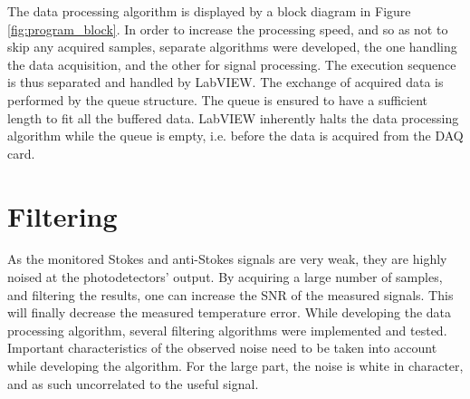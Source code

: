 \documentclass{standalone}
\begin{document}
The data processing algorithm is displayed by a block diagram in Figure \ref{fig:program_block}.
In order to increase the processing speed, and so as not to skip any acquired samples, separate algorithms were developed, the one handling the data acquisition, and the other for signal processing. The execution sequence is thus separated and handled by LabVIEW. The exchange of acquired data is performed by the queue structure. The queue is ensured to have a sufficient length to fit all the buffered data. LabVIEW inherently halts the data processing algorithm while the queue is empty, i.e. before the data is acquired from the DAQ card.

\section{Filtering}

As the monitored Stokes and anti-Stokes signals are very weak, they are highly noised at the photodetectors' output. By acquiring a large number of samples, and filtering the results, one can increase the SNR of the measured signals. This will finally decrease the measured temperature error. While developing the data processing algorithm, several filtering algorithms were implemented and tested. Important characteristics of the observed noise need to be taken into account while developing the algorithm. For the large part, the noise is white in character, and as such uncorrelated to the useful signal. \\
\end{document}

